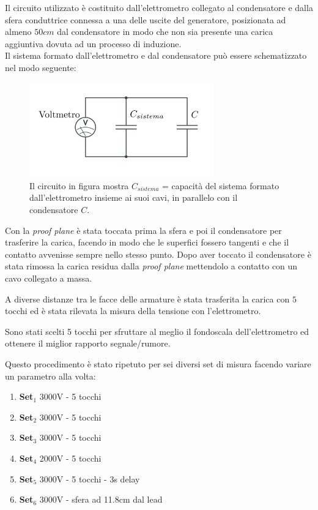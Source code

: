{\fontsize{12}{14}\selectfont 

Il circuito utilizzato è costituito dall'elettrometro collegato al condensatore e dalla sfera conduttrice connessa a una delle uscite del generatore, posizionata ad almeno $50cm$ dal condensatore in modo che non sia presente una carica aggiuntiva dovuta ad un processo di induzione. 
\\
Il sistema formato dall'elettrometro e dal condensatore può essere schematizzato nel modo seguente:

\begin{figure}[H]
  \begin{minipage}[c]{0.4\textwidth}
    \includegraphics[width=8cm]{Figures/SchemaCircuitale3.png}
  \end{minipage}\hfill
  \begin{minipage}[c]{0.55\textwidth}
    \caption{
       Il circuito in figura mostra $C_{sistema}$ = capacità del sistema formato dall'elettrometro insieme ai suoi cavi, in parallelo con il condensatore $C$.
    } \label{fig:schemacircuitale}
  \end{minipage}
\end{figure}


Con la \emph{proof plane} è stata toccata prima la sfera e poi il condensatore per trasferire la carica, facendo in modo che le superfici fossero tangenti e che il contatto avvenisse sempre nello stesso punto. Dopo aver toccato il condensatore è stata rimossa la carica residua dalla \emph{proof plane} mettendolo a contatto con un cavo collegato a massa.

A diverse distanze tra le facce delle armature è stata trasferita la carica con $5$ tocchi ed è stata rilevata la misura della tensione con l'elettrometro.

Sono stati scelti 5 tocchi per sfruttare al meglio il fondoscala dell'elettrometro ed ottenere il miglior rapporto segnale/rumore.


Questo procedimento è stato ripetuto per sei diversi set di misura facendo variare un parametro alla volta:

\begin{enumerate}
    \item \textbf{Set$_1$} 3000V - 5 tocchi
    \item \textbf{Set$_2$} 3000V - 5 tocchi
    \item \textbf{Set$_3$} 3000V - 5 tocchi
    \item \textbf{Set$_4$} 2000V - 5 tocchi
    \item \textbf{Set$_5$} 3000V - 5 tocchi - 3s delay
    \item \textbf{Set$_6$} 3000V - sfera ad 11.8cm dal lead
\end{enumerate}

}
